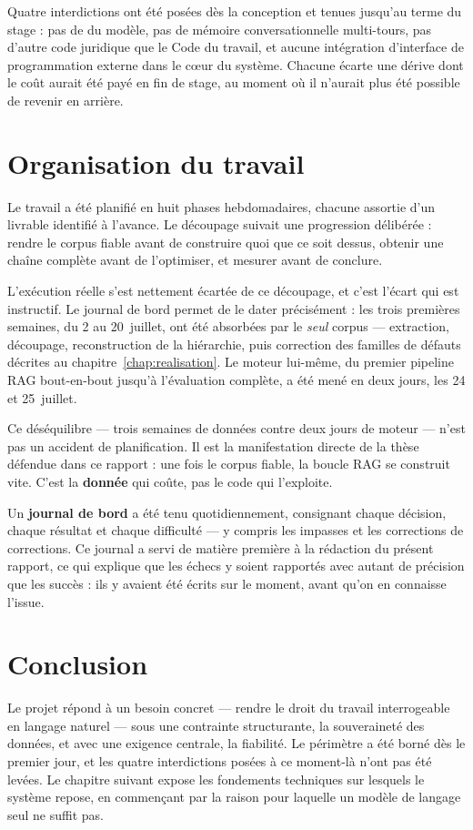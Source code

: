Quatre interdictions ont été posées dès la conception et tenues jusqu'au terme du stage : pas de
 du modèle, pas de mémoire conversationnelle multi-tours, pas d'autre code
juridique que le Code du travail, et aucune intégration d'interface de programmation externe dans
le cœur du système. Chacune écarte une dérive dont le coût aurait été payé en fin de stage, au
moment où il n'aurait plus été possible de revenir en arrière.

\section{Organisation du travail}

Le travail a été planifié en huit phases hebdomadaires, chacune assortie d'un livrable identifié à
l'avance. Le découpage suivait une progression délibérée : rendre le corpus fiable avant de
construire quoi que ce soit dessus, obtenir une chaîne complète avant de l'optimiser, et mesurer
avant de conclure.

L'exécution réelle s'est nettement écartée de ce découpage, et c'est l'écart qui est instructif.
Le journal de bord permet de le dater précisément : les trois premières semaines, du 2 au
20~juillet, ont été absorbées par le \emph{seul} corpus --- extraction, découpage, reconstruction
de la hiérarchie, puis correction des familles de défauts décrites au
chapitre~\ref{chap:realisation}. Le moteur lui-même, du premier pipeline RAG bout-en-bout jusqu'à
l'évaluation complète, a été mené en deux jours, les 24 et 25~juillet.

\begin{constat}
Ce déséquilibre --- trois semaines de données contre deux jours de moteur --- n'est pas un
accident de planification. Il est la manifestation directe de la thèse défendue dans ce rapport :
une fois le corpus fiable, la boucle RAG se construit vite. C'est la \textbf{donnée} qui coûte,
pas le code qui l'exploite.
\end{constat}

Un \textbf{journal de bord} a été tenu quotidiennement, consignant chaque décision, chaque
résultat et chaque difficulté --- y compris les impasses et les corrections de corrections. Ce
journal a servi de matière première à la rédaction du présent rapport, ce qui explique que les
échecs y soient rapportés avec autant de précision que les succès : ils y avaient été écrits sur
le moment, avant qu'on en connaisse l'issue.

\section*{Conclusion}

Le projet répond à un besoin concret --- rendre le droit du travail interrogeable en langage
naturel --- sous une contrainte structurante, la souveraineté des données, et avec une exigence
centrale, la fiabilité. Le périmètre a été borné dès le premier jour, et les quatre interdictions
posées à ce moment-là n'ont pas été levées. Le chapitre suivant expose les fondements techniques
sur lesquels le système repose, en commençant par la raison pour laquelle un modèle de langage
seul ne suffit pas.
